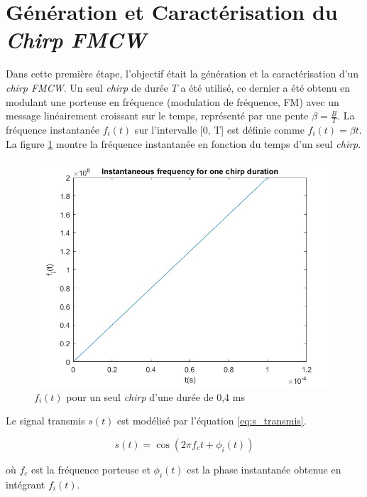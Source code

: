 \section {Génération et Caractérisation du \textit{Chirp FMCW}}

Dans cette première étape, l'objectif était la génération et la caractérisation d'un \textit{chirp FMCW}. Un seul \textit{chirp} de durée \( T \) a été utilisé, ce dernier a été obtenu en modulant une porteuse en fréquence (modulation de fréquence, FM) avec un message linéairement croissant sur le temps, représenté par une pente \( \beta = \frac{B}{T} \). La fréquence instantanée \( f_i(t) \) sur l'intervalle [0, T] est définie comme \( f_i(t) = \beta t \). La figure \ref{fig:fi_t_chirp} montre la fréquence instantanée en fonction du temps d'un seul \textit{chirp}.

\begin{figure}[H]
  \centering
  \includegraphics[scale = 0.25]{Pictures/one_chirp.jpg}
    \caption{\( f_i(t) \) pour un seul \textit{chirp} d'une durée de 0,4 ms }
    \label{fig:fi_t_chirp}
\end{figure}

Le signal transmis \( s(t) \) est modélisé par l'équation \ref{eq:s_transmis}.

\begin{equation} 
    s(t) = \cos(2\pi f_ct + \phi_i(t))
    \label{eq:s_transmis}
\end{equation}

où \( f_c \) est la fréquence porteuse et \( \phi_i(t) \) est la phase instantanée obtenue en intégrant \( f_i(t) \).

